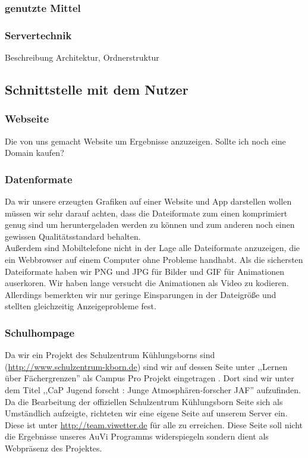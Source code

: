 \documentclass[a4paper,oneside,12pt,titlepage]{article}
\newcommand{\jf}{Jugend forscht }
\newcommand{\link}[1]{\textcolor{link}{\url{#1}}}	%
\begin{document}
\subsubsection{genutzte Mittel} %

\subsubsection{Servertechnik} %
Beschreibung Architektur, Ordnerstruktur

\subsection{Schnittstelle mit dem Nutzer} %

\subsubsection{Webseite} %
Die von uns gemacht Website um Ergebnisse anzuzeigen. Sollte ich noch eine Domain kaufen?

\subsubsection{Datenformate} %
Da wir unsere erzeugten Grafiken auf einer Website und App darstellen wollen müssen wir sehr darauf achten, dass die Dateiformate zum einen komprimiert genug sind um heruntergeladen werden zu können und zum anderen noch einen gewissen Qualitätsstandard behalten.\\
Außerdem sind Mobiltelefone nicht in der Lage alle Dateiformate anzuzeigen, die ein Webbrowser auf einem Computer ohne Probleme handhabt. Als die sichersten Dateiformate haben wir PNG und JPG für Bilder und GIF für Animationen auserkoren. Wir haben lange versucht die Animationen als Video zu kodieren. Allerdings bemerkten wir nur geringe Einsparungen in der Dateigröße und stellten gleichzeitig Anzeigeprobleme fest.

\subsubsection{Schulhompage} %
Da wir ein Projekt des Schulzentrum Kühlungsborns sind (\link{http://www.schulzentrum-kborn.de}) sind wir auf dessen Seite unter ,,Lernen über Fächergrenzen'' als Campus Pro Projekt eingetragen \cite{szkb}. Dort sind wir unter dem Titel ,,CaP \jf : Junge Atmosphären-forscher JAF'' aufzufinden. Da die Bearbeitung der offiziellen Schulzentrum Kühlungsborn Seite sich als Umständlich aufzeigte, richteten wir eine eigene Seite auf unserem Server ein. 
Diese ist unter \link{http://team.viwetter.de}
für alle zu erreichen. Diese Seite soll nicht die Ergebnisse unseres AuVi Programms widerspiegeln sondern dient als Webpräsenz des Projektes.
\end{document}
